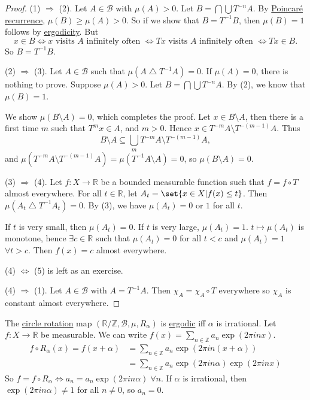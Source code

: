\documentclass{article}
\newcommand{\sym}{\bigtriangleup}
\begin{document}
\begin{proof}
  (1) $\Rightarrow$ (2).
  Let $A \in \mathcal{B}$ with $\mu(A) > 0$. Let $B = \bigcap \bigcup T^{-n}A$.
  By \hyperlink{thm:poincare}{Poincar\'e recurrence}, $\mu(B) \geq \mu(A) > 0$.
  So if we show that $B = T^{-1} B$, then $\mu(B) = 1$ follows by \hyperlink{def:ergodic}{ergodicity}.
  But
  \begin{equation*}x \in B \iff x\text{ visits }A\text{ infinitely often }\iff Tx\text{ visits }A\text{ infinitely often }\iff Tx \in B.\end{equation*}
  So $B = T^{-1} B$.

  (2) $\Rightarrow$ (3). Let $A \in \mathcal{B}$ such that $\mu(A \sym T^{-1} A) = 0$. If $\mu(A) = 0$, there is nothing to prove. Suppose $\mu(A) > 0$.
  Let $B = \bigcap \bigcup T^{-n} A$. By (2), we know that $\mu(B) = 1$.

  We show $\mu(B \setminus A) = 0$, which completes the proof.
  Let $x \in B \setminus A$, then there is a first time $m$ such that $T^m x \in A$, and $m > 0$.
  Hence $x \in T^{-m} A \setminus T^{-(m-1)}A$. Thus
  \begin{equation*}
    B \setminus A \subseteq \bigcup_m T^{-m} A \setminus T^{-(m-1)} A,
  \end{equation*}
  and $\mu(T^{-m} A \setminus T^{-(m-1)} A) = \mu(T^{-1} A \setminus A) = 0$, so $\mu(B \setminus A) = 0$.

  (3) $\Rightarrow$ (4).
  Let $f : X \to \mathbb{R}$ be a bounded measurable function such that $f = f \circ T$ almost everywhere.
  For all $t \in \mathbb{R}$, let $A_t = \set{x \in X | f(x) \leq t}$.
  Then $\mu(A_t \sym T^{-1} A_t) = 0$.
  By (3), we have $\mu(A_t) = 0$ or $1$ for all $t$.

  If $t$ is very small, then $\mu(A_t) = 0$. If $t$ is very large, $\mu(A_t) = 1$. $t \mapsto \mu(A_t)$ is monotone, hence $\exists c \in \mathbb{R}$ such that $\mu(A_t) = 0$ for all $t < c$ and $\mu(A_t) = 1$ $\forall t > c$.
  Then $f(x) = c$ almost everywhere.

  (4) $\Leftrightarrow$ (5) is left as an exercise.

  (4) $\Rightarrow$ (1). Let $A \in \mathcal{B}$ with $A = T^{-1} A$. Then $\chi_A = \chi_A \circ T$ everywhere so $\chi_A$ is constant almost everywhere.
\end{proof}
\begin{eg}
  The \hyperlink{def:circ}{circle rotation} map $(\mathbb{R}/\mathbb{Z}, \mathcal{B}, \mu, R_\alpha)$ is \hyperlink{def:ergodic}{ergodic} iff $\alpha$ is irrational.
  Let $f: X \to \mathbb{R}$ be measurable. We can write $f(x) = \sum_{n \in \mathbb{Z}} a_n \exp(2\pi i n x)$.
  \begin{align*}
    f \circ R_\alpha(x) = f(x + \alpha) &= \sum_{n \in \mathbb{Z}} a_n \exp(2 \pi i n (x + \alpha)) \\
                                        &= \sum_{n \in \mathbb{Z}} a_n \exp(2\pi i n \alpha) \exp(2 \pi i n x)
  \end{align*}
  So $f = f \circ R_\alpha \iff a_n = a_n \exp(2 \pi i n \alpha) \; \forall n$. If $\alpha$ is irrational, then $\exp(2 \pi i n \alpha) \neq 1$ for all $n \neq 0$, so $a_n = 0$.
\end{eg}
\end{document}
